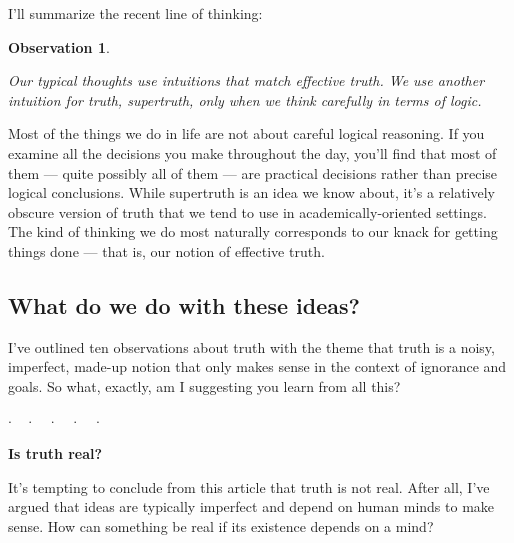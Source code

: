 \documentclass[11pt, oneside]{article}
\newtheorem{obs}{Observation}
\newcommand{\dotq}{\cdot\quad}
\newcommand{\scenebreak}{
    \medskip\centerline{$\dotq\dotq\dotq\dotq\cdot$}\medskip
}
\begin{document}
I'll summarize the recent line of thinking:
\newcommand{\obsten}{
    Our typical thoughts use intuitions that match effective truth.
    We use another intuition for truth, supertruth, only when we think
    carefully in terms of logic.
}
\begin{obs}\label{o10}
    \obsten
\end{obs}
Most of the things we do in life are not about careful logical reasoning. If you
examine all the decisions you make throughout
the day, you'll find that most of them --- quite possibly all of them --- 
are practical decisions rather than precise logical conclusions.
While supertruth is an idea we know
about, it's a relatively obscure version of truth that we tend to use
in academically-oriented settings.
The kind of thinking we do most naturally corresponds to our knack for
getting things done --- that is, our notion of effective truth.


\subsection{What do we do with these ideas?}

I've outlined ten observations about truth with the theme that
truth is a noisy, imperfect, made-up notion that only makes sense in the context
of ignorance and goals. So what, exactly, am I suggesting you learn from
all this?

\scenebreak

\noindent
{\bf Is truth real?}

It's tempting to conclude from this article that truth is not real.
After all, I've argued that ideas are typically imperfect and depend on
human minds to make sense. How can something be real if its existence depends on
a mind?
\end{document}
